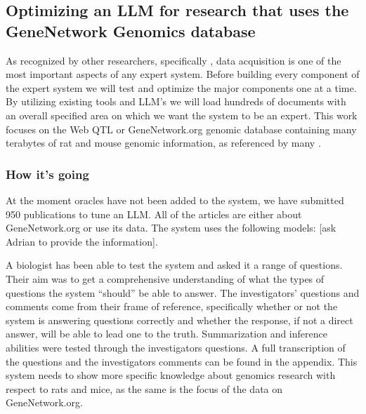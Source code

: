 \subsection{Optimizing an LLM for research that uses the GeneNetwork Genomics database}

As recognized by other researchers, specifically \cite{Tan:2017}, data acquisition is one of the most important aspects of any expert system. 
Before building every component of the expert system we will test and optimize the major components one at a time.
By utilizing existing tools and LLM's we will load hundreds of documents with an overall specified area on which we want the system to be an expert.
This work focuses on the Web QTL or GeneNetwork.org genomic database containing many terabytes of rat and mouse genomic information, as referenced by many \cite{Chesler:2004,Alberts:2010} \cite{Alberts:2010} \cite{Mulligan:2017} \cite{Watson:2020}.

\subsubsection{How it's going}
At the moment oracles have not been added to the system, we have submitted 950 publications to tune an LLM.
All of the articles are either about GeneNetwork.org or use its data.
The system uses the following models: [ask Adrian to provide the information].

A biologist has been able to test the system and asked it a range of questions.
Their aim was to get a comprehensive understanding of what the types of questions the system ``should'' be able to answer.
The investigators' questions and comments come from their frame of reference, specifically whether or not the system is answering questions correctly and whether the response, if not a direct answer, will be able to lead one to the truth.
Summarization and inference abilities were tested through the investigators questions.
A full transcription of the questions and the investigators comments can be found in the appendix.%
This system needs to show more specific knowledge about genomics research with respect to rats and mice, as the same is the focus of the data on GeneNetwork.org.


